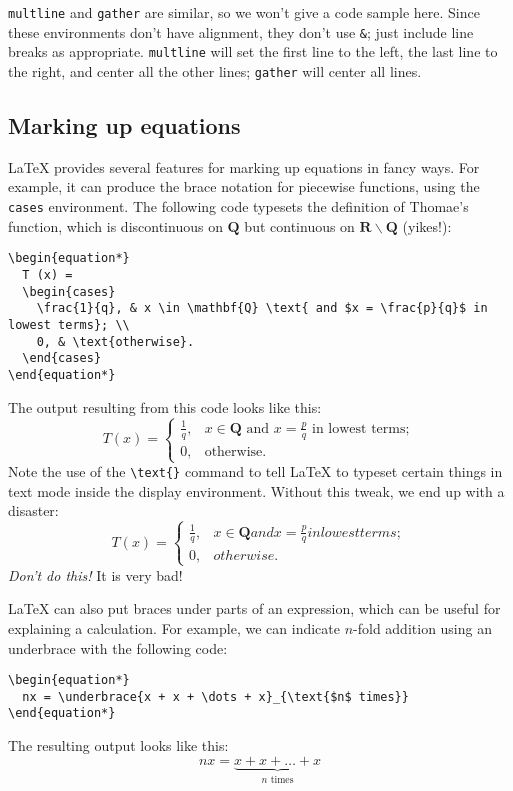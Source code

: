 \documentclass{article}
\newcommand*{\code}[1]{\texttt{#1}}
\begin{document}
\code{multline} and \code{gather} are similar, so we won't give a code sample here.
Since these environments don't have alignment, they don't use \code{\&}; just include line breaks as appropriate.
\code{multline} will set the first line to the left, the last line to the right, and center all the other lines; \code{gather} will center all lines.

\subsection{Marking up equations}
\LaTeX{} provides several features for marking up equations in fancy ways.
For example, it can produce the brace notation for piecewise functions, using the \code{cases} environment.
The following code typesets the definition of Thomae's function, which is discontinuous on $\mathbf{Q}$ but continuous on $\mathbf{R} \backslash \mathbf{Q}$ (yikes!):
\begin{verbatim}
\begin{equation*}
  T (x) =
  \begin{cases}
    \frac{1}{q}, & x \in \mathbf{Q} \text{ and $x = \frac{p}{q}$ in lowest terms}; \\
    0, & \text{otherwise}.
  \end{cases}
\end{equation*}
\end{verbatim}
The output resulting from this code looks like this:
\begin{equation*}
  T (x) =
  \begin{cases}
    \frac{1}{q}, & x \in \mathbf{Q} \text{ and $x = \frac{p}{q}$ in lowest terms}; \\
    0, & \text{otherwise}.
  \end{cases}
\end{equation*}
Note the use of the \code{\textbackslash{}text\{\}} command to tell \LaTeX{} to typeset certain things in text mode inside the display environment.
Without this tweak, we end up with a disaster:
\begin{equation*}
  T (x) =
  \begin{cases}
    \frac{1}{q}, & x \in \mathbf{Q} and x = \frac{p}{q} in lowest terms; \\
    0, & otherwise.
  \end{cases}
\end{equation*}
\emph{Don't do this!}
It is very bad!

\LaTeX{} can also put braces under parts of an expression, which can be useful for explaining a calculation.
For example, we can indicate $n$-fold addition using an underbrace with the following code:
\begin{verbatim}
\begin{equation*}
  nx = \underbrace{x + x + \dots + x}_{\text{$n$ times}}
\end{equation*}
\end{verbatim}
The resulting output looks like this:
\begin{equation*}
  nx = \underbrace{x + x + \dots + x}_{\text{$n$ times}}
\end{equation*}
\end{document}
